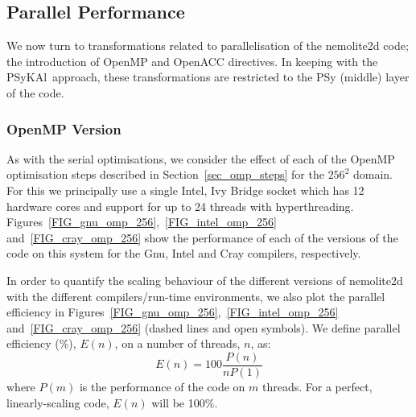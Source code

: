 \documentclass[journal]{IEEEtran}
\newcommand{\psykal}{{PS}y{KA}l\ }
\begin{document}
%
%



\subsection{Parallel Performance}

We now turn to transformations related to parallelisation of the
nemolite2d code; the introduction of OpenMP and OpenACC directives. In
keeping with the \psykal approach, these transformations are
restricted to the PSy (middle) layer of the code.

\subsubsection{OpenMP Version}

As with the serial optimisations, we consider the effect of each of
the OpenMP optimisation steps described in Section~\ref{sec_omp_steps}
for the $256^2$ domain. For this we principally use a single Intel,
Ivy Bridge socket which has 12 hardware cores and support for up to 24
threads with hyperthreading.
Figures~\ref{FIG_gnu_omp_256},~\ref{FIG_intel_omp_256}
and~\ref{FIG_cray_omp_256} show the performance of each of the
versions of the code on this system for the Gnu, Intel and Cray
compilers, respectively.

In order to quantify the scaling behaviour of the different versions
of nemolite2d with the different compilers/run-time environments, we
also plot the parallel efficiency in
Figures~\ref{FIG_gnu_omp_256},~\ref{FIG_intel_omp_256}
and~\ref{FIG_cray_omp_256} (dashed lines and open symbols). We define
parallel efficiency (\%), $E(n)$, on a number of threads, $n$, as:
\[
E(n) = 100  \frac{P(n)}{ n P(1)}
\]
where $P(m)$ is the performance of the code on $m$ threads. For a
perfect, linearly-scaling code, $E(n)$ will be 100\%.
\end{document}
